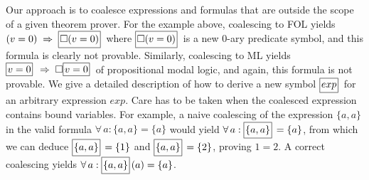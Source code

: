 \documentclass{easychair}
\renewcommand{\implies}{\Rightarrow}
\newcommand{\B}[1]{\framebox{\rule{0pt}{.6em}\ensuremath{\!\tlachars #1\!}}\,}
\newcommand{\edmargin}[2]{\marginpar{\raggedright\footnotesize\color{red}#1: #2}}
\newcommand{\edmargin}[2]{}
\def\llmargin{\edmargin{LL}}
\def\smmargin{\edmargin{SM}}
\def\tlmargin{\edmargin{TL}}
\let\tlachars\relax
\def\A{\forall\,}
\begin{document}

Our approach is to coalesce expressions and formulas that are outside
the scope of a given theorem prover.  For the example above, coalescing
to FOL yields
\(  (v = 0) \;\implies\; \B{\Box(v=0)} \)
where $\B{\Box(v=0)}$ is a new $0$-ary predicate symbol, and this formula is
clearly not provable.
Similarly, coalescing to ML yields
\(  \B{v=0} \;\implies\; \Box\B{v=0}  \)
of propositional modal logic, and again, this formula is not provable.
We give a
detailed description of how to derive a new symbol $\B{exp}$ for an
arbitrary expression $exp$.  Care has to be taken when the coalesced expression
contains bound variables.
For example, a naive
coalescing of the expression $\{a, a\}$ in the valid formula
  \mbox{$\A a : \{a, a\} = \{a\}$}
would yield
  \mbox{$\A a : \B{\{a, a\}} = \{a\}$},
from which we can deduce $\B{\{a, a\}} = \{1\}$ and $\B{\{a, a\}} = \{2\}$,
proving $1=2$.  A correct
coalescing yields
  \mbox{$\A a : \B{\{a, a\}}(a) = \{a\}$}.
\end{document}
